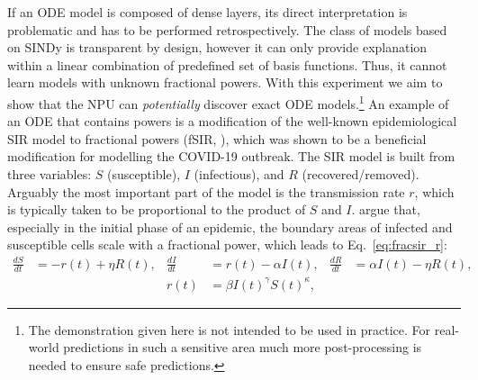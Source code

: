 \documentclass[9pt]{article}
\begin{document}
If an ODE model is composed of dense layers, its direct interpretation is
problematic and has to be performed retrospectively. The class of models based on
SINDy is transparent by design, however it can only provide explanation
within a linear combination of predefined set of basis functions. Thus, it
cannot learn models with unknown fractional powers. 
With this experiment we aim to show that the NPU can \emph{potentially} discover
exact ODE models.\footnote{The demonstration given here is not intended to be
used in practice. For real-world predictions in such a sensitive area much more
post-processing is needed to ensure safe predictions.}
An example of an ODE that contains powers is a modification of the well-known
epidemiological SIR model \citep{kermack_contribution_1927} to fractional powers
(fSIR, \cite{taghvaei_fractional_2020}), which was shown to be a beneficial
modification for modelling the COVID-19 outbreak.  The SIR model is
built from three variables: $S$ (susceptible), $I$ (infectious), and $R$
(recovered/removed).  Arguably the most important part of the model is the
transmission rate $r$, which is typically taken to be proportional to the
product of $S$ and $I$.  \citet{taghvaei_fractional_2020} argue that,
especially in the initial phase of an epidemic, the boundary areas of infected
and susceptible cells scale with a fractional power, which leads to
Eq.~\ref{eq:fracsir_r}:
\begin{align}
  \label{eq:fracsir}
  \frac{dS}{dt} &= -r(t) + \eta R(t), &
  \frac{dI}{dt} &=  r(t) - \alpha I(t), &
  \frac{dR}{dt} &= \alpha I(t) - \eta R(t),\\
  \label{eq:fracsir_r}
  & & r(t) &= \beta I(t)^\gamma S(t)^\kappa,
\end{align}
\end{document}
